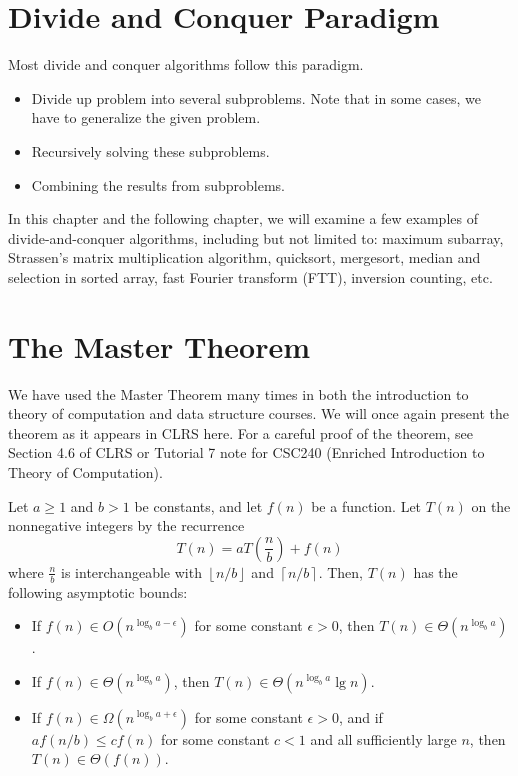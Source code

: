 \section{Divide and Conquer Paradigm}

Most divide and conquer algorithms follow this paradigm.

\begin{itemize}
    \item Divide up problem into several subproblems. Note that in some cases, we have to generalize the given problem.
    \item Recursively solving these subproblems.
    \item Combining the results from subproblems.
\end{itemize}

In this chapter and the following chapter, we will examine a few examples of divide-and-conquer algorithms, including but not limited to: maximum subarray, Strassen's matrix multiplication algorithm, quicksort, mergesort, median and selection in sorted array, fast Fourier transform (FTT), inversion counting, etc.

\section{The Master Theorem} 

We have used the Master Theorem many times in both the introduction to theory of computation and data structure courses. We will once again present the theorem as it appears in CLRS here. For a careful proof of the theorem, see Section 4.6 of CLRS or Tutorial 7 note for CSC240 (Enriched Introduction to Theory of Computation).

\begin{theorem}
    Let $a\geq 1$ and $b>1$ be constants, and let $f(n)$ be a function. Let $T(n)$ on the nonnegative integers by the recurrence
    $$
    T(n) = aT\left( \frac{n}{b} \right) + f(n)
    $$
    where $\frac{n}{b}$ is interchangeable with $\left\lfloor n/b \right\rfloor$ and $\left\lceil n/b \right\rceil $. Then, $T(n)$ has the following asymptotic bounds:
    \begin{itemize}
        \item If $f(n) \in O(n^{\log_b a - \epsilon})$ for some constant $\epsilon > 0$, then $T(n) \in \Theta(n^{\log_b a})$.
        \item If $f(n) \in \Theta(n^{\log_b a})$, then $T(n) \in \Theta(n^{\log_b a} \lg n)$.
        \item If $f(n) \in \Omega(n^{\log_b a+\epsilon})$ for some constant $\epsilon > 0$, and if $af(n/b) \leq cf(n)$ for some constant $c < 1$ and all sufficiently large $n$, then $T(n) \in \Theta(f(n))$. 
    \end{itemize}
\end{theorem}

